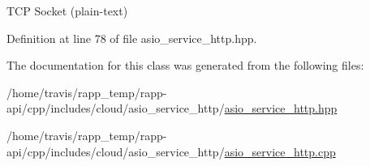 T\-C\-P Socket (plain-\/text) 



Definition at line 78 of file asio\-\_\-service\-\_\-http.\-hpp.



The documentation for this class was generated from the following files\-:\begin{DoxyCompactItemize}
\item 
/home/travis/rapp\-\_\-temp/rapp-\/api/cpp/includes/cloud/asio\-\_\-service\-\_\-http/\hyperlink{asio__service__http_8hpp}{asio\-\_\-service\-\_\-http.\-hpp}\item 
/home/travis/rapp\-\_\-temp/rapp-\/api/cpp/includes/cloud/asio\-\_\-service\-\_\-http/\hyperlink{asio__service__http_8cpp}{asio\-\_\-service\-\_\-http.\-cpp}\end{DoxyCompactItemize}
